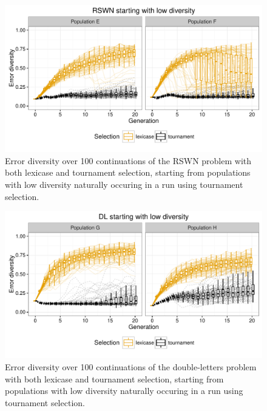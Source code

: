 \documentclass{sig-alternate-05-2015}
\begin{document}
\begin{figure}
	\includegraphics{../figures/RSWN_low_diversity}
	\vspace{-1 cm}
	\caption{Error diversity over 100 continuations of the RSWN problem with both lexicase and tournament selection, starting from populations with low diversity  naturally occuring in a run using tournament selection.}
	\label{fig:RSWNlowDiversity}
\end{figure}

\begin{figure}
	\includegraphics{../figures/DL_low_diversity}
	\vspace{-1 cm}
	\caption{Error diversity over 100 continuations of the double-letters problem with both lexicase and tournament selection, starting from populations with low diversity naturally occuring in a run using tournament selection.}
	\label{fig:DLlowDiversity}
\end{figure}
\end{document}
